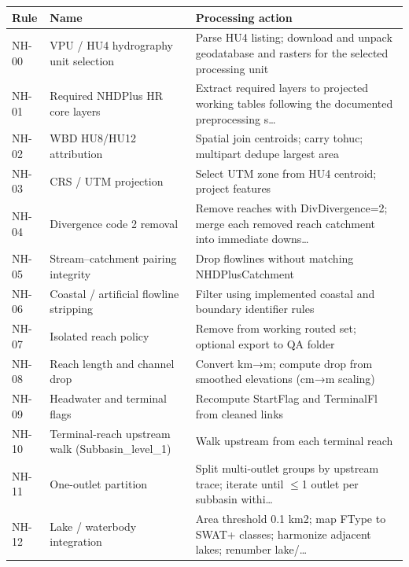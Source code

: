 \begin{tabular}{@{}llp{6.8cm}@{}}
\toprule
Rule & Name & Processing action \\
\midrule
NH-00 & VPU / HU4 hydrography unit selection & Parse HU4 listing; download and unpack geodatabase and rasters for the selected processing unit \\
NH-01 & Required NHDPlus HR core layers & Extract required layers to projected working tables following the documented preprocessing s\ldots \\
NH-02 & WBD HU8/HU12 attribution & Spatial join centroids; carry tohuc; multipart dedupe largest area \\
NH-03 & CRS / UTM projection & Select UTM zone from HU4 centroid; project features \\
NH-04 & Divergence code 2 removal & Remove reaches with DivDivergence=2; merge each removed reach catchment into immediate downs\ldots \\
NH-05 & Stream–catchment pairing integrity & Drop flowlines without matching NHDPlusCatchment \\
NH-06 & Coastal / artificial flowline stripping & Filter using implemented coastal and boundary identifier rules \\
NH-07 & Isolated reach policy & Remove from working routed set; optional export to QA folder \\
NH-08 & Reach length and channel drop & Convert km→m; compute drop from smoothed elevations (cm→m scaling) \\
NH-09 & Headwater and terminal flags & Recompute StartFlag and TerminalFl from cleaned links \\
NH-10 & Terminal-reach upstream walk (Subbasin\_level\_1) & Walk upstream from each terminal reach \\
NH-11 & One-outlet partition & Split multi-outlet groups by upstream trace; iterate until $\leq$1 outlet per subbasin withi\ldots \\
NH-12 & Lake / waterbody integration & Area threshold 0.1 km2; map FType to SWAT+ classes; harmonize adjacent lakes; renumber lake/\ldots \\
\bottomrule
\end{tabular}
